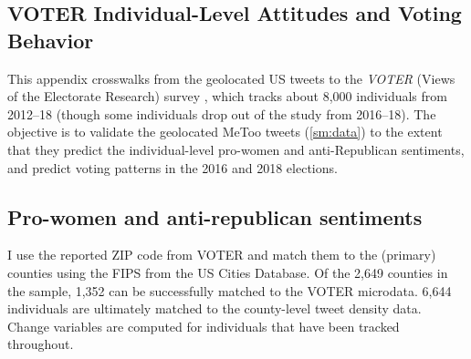 \documentclass[manuscript,screen,nonacm,11pt,acm]{acmart}
\begin{document}
\begin{bibunit}
\clearpage
\FloatBarrier
\section{VOTER Individual-Level Attitudes and Voting Behavior}
\label{sm:VOTER}
This appendix crosswalks from the geolocated US tweets to the \emph{VOTER} (Views of the Electorate Research) survey \citep{voter}, which tracks about 8,000 individuals from 2012--18 (though some individuals drop out of the study from 2016--18).
The objective is to validate the geolocated MeToo tweets (\cref{sm:data}) to the extent that they predict the individual-level pro-women and anti-Republican sentiments, and predict voting patterns in the 2016 and 2018 elections.

\subsection{Pro-women and anti-republican sentiments}
I use the reported ZIP code from VOTER and match them to the (primary) counties using the FIPS from the US Cities Database.
Of the 2,649 counties in the sample, 1,352 can be successfully matched to the VOTER microdata.
6,644 individuals are ultimately matched to the county-level tweet density data.
Change variables are computed for individuals that have been tracked throughout.


\end{bibunit}
\end{document}
